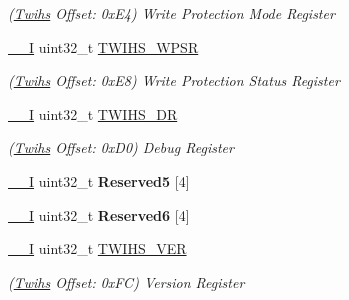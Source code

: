 \begin{DoxyCompactItemize}
\begin{DoxyCompactList}\small\item\em (\mbox{\hyperlink{structTwihs}{Twihs}} Offset\+: 0x\+E4) Write Protection Mode Register \end{DoxyCompactList}\item 
\mbox{\label{structTwihs_acfb352af71076e6cd58c6ea4472fb53b}} 
\mbox{\hyperlink{core__cm7_8h_af63697ed9952cc71e1225efe205f6cd3}{\+\_\+\+\_\+I}} uint32\+\_\+t \mbox{\hyperlink{structTwihs_acfb352af71076e6cd58c6ea4472fb53b}{T\+W\+I\+H\+S\+\_\+\+W\+P\+SR}}
\begin{DoxyCompactList}\small\item\em (\mbox{\hyperlink{structTwihs}{Twihs}} Offset\+: 0x\+E8) Write Protection Status Register \end{DoxyCompactList}\item 
\mbox{\label{structTwihs_adf505a2e00d0c08253db38673fffbb54}} 
\mbox{\hyperlink{core__cm7_8h_af63697ed9952cc71e1225efe205f6cd3}{\+\_\+\+\_\+I}} uint32\+\_\+t \mbox{\hyperlink{structTwihs_adf505a2e00d0c08253db38673fffbb54}{T\+W\+I\+H\+S\+\_\+\+DR}}
\begin{DoxyCompactList}\small\item\em (\mbox{\hyperlink{structTwihs}{Twihs}} Offset\+: 0x\+D0) Debug Register \end{DoxyCompactList}\item 
\mbox{\label{structTwihs_a0935541eeaf72a67756cccd6b7e34ce1}} 
\mbox{\hyperlink{core__cm7_8h_af63697ed9952cc71e1225efe205f6cd3}{\+\_\+\+\_\+I}} uint32\+\_\+t {\bfseries Reserved5} \mbox{[}4\mbox{]}
\item 
\mbox{\label{structTwihs_a664bd41eb23ef9e53adc7a187d4c72be}} 
\mbox{\hyperlink{core__cm7_8h_af63697ed9952cc71e1225efe205f6cd3}{\+\_\+\+\_\+I}} uint32\+\_\+t {\bfseries Reserved6} \mbox{[}4\mbox{]}
\item 
\mbox{\label{structTwihs_a22eaeeb6970941790d6a193af6b3b960}} 
\mbox{\hyperlink{core__cm7_8h_af63697ed9952cc71e1225efe205f6cd3}{\+\_\+\+\_\+I}} uint32\+\_\+t \mbox{\hyperlink{structTwihs_a22eaeeb6970941790d6a193af6b3b960}{T\+W\+I\+H\+S\+\_\+\+V\+ER}}
\begin{DoxyCompactList}\small\item\em (\mbox{\hyperlink{structTwihs}{Twihs}} Offset\+: 0x\+FC) Version Register \end{DoxyCompactList}\end{DoxyCompactItemize}


